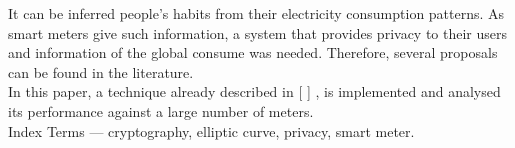 
	It can be inferred people's habits from their electricity consumption patterns. As smart meters give such information, a system that provides privacy to their users and information of the global consume was needed. Therefore, several proposals can be found in the literature.\\
	
	In this paper, a technique already described in [ ] %
	, is implemented and analysed its performance against a large number of meters.\\
	Index Terms --- cryptography, elliptic curve, privacy, smart meter.
